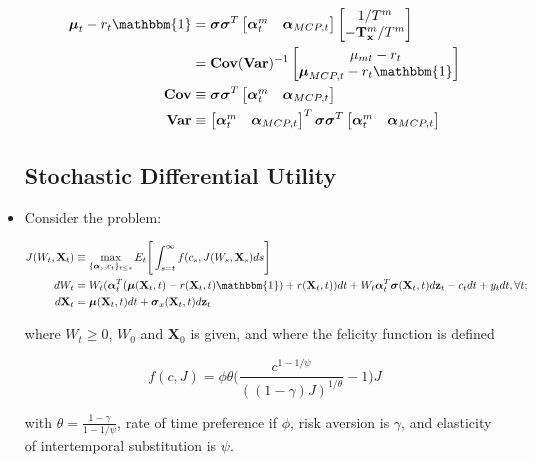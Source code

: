 \documentclass{article}
\newcommand{\xbf}{\mathbf{x}}
\newcommand{\Xbf}{\mathbf{X}}
\newcommand{\zbf}{\mathbf{z}}
\newcommand{\Tbf}{\mathbf{T}}
\newcommand{\mubf}{\boldsymbol{\mu}}
\newcommand{\alphabf}{\boldsymbol{\alpha}}
\newcommand{\sigmabf}{\boldsymbol{\sigma}}
\newcommand{\onebf}{\mathbbm{1}}
\newcommand{\Covbf}{\text{\textbf{Cov}}}
\newcommand{\Varbf}{\text{\textbf{Var}}}
\begin{document}
\begin{itemize}
\begin{align*}
\mubf_t - r_t \onebf 
&= \sigmabf \sigmabf^T \begin{bmatrix} \alphabf_t^m & \alphabf_{MCP, t} \end{bmatrix} \begin{bmatrix} 1/ T^m \\ -\Tbf_\xbf^m / T^m \end{bmatrix} \\
&= \Covbf(\Varbf)^{-1} \begin{bmatrix} \mu_{mt} - r_t \\ \mubf_{MCP, t} - r_t \onebf \end{bmatrix} \\
\Covbf &\equiv \sigmabf \sigmabf^T \begin{bmatrix} \alphabf_t^m & \alphabf_{MCP, t} \end{bmatrix} \\
\Varbf &\equiv \begin{bmatrix} \alphabf_t^m & \alphabf_{MCP, t} \end{bmatrix}^T \sigmabf \sigmabf^T \begin{bmatrix} \alphabf_t^m & \alphabf_{MCP, t} \end{bmatrix}
\end{align*}

\subsection*{Stochastic Differential Utility}

\item Consider the problem: 

\begin{align*}
J(W_t, \Xbf_t) &\equiv \max_{\{\alphabf_s, c_t\}_{t \le s}} E_t \Bigg[ \int_{s=t}^\infty f(c_s, J(W_s, \Xbf_s) ds\Bigg]\\
dW_t &= W_t (\alphabf_t^T (\mubf(\Xbf_t, t) - r(\Xbf_t, t)\onebf) + r(\Xbf_t, t))dt + W_t \alphabf_t^T \sigmabf(\Xbf_t, t) d\zbf_t - c_t dt + y_t dt, \forall t;\\
d\Xbf_t &= \mubf(\Xbf_t, t) dt + \sigmabf_x(\Xbf_t, t) d\zbf_t
\end{align*}

where $W_t \ge 0$, $W_0$ and $\Xbf_0$ is given, and where the felicity function is defined

$$
f(c, J) = \phi \theta \Bigg( \frac{c^{1-1/\psi}}{((1-\gamma)J)^{1/\theta}} - 1 \Bigg) J
$$

with $\theta = \frac{1 - \gamma}{1 - 1/\psi}$, rate of time preference if $\phi$, risk aversion is $\gamma$, and elasticity of intertemporal substitution is $\psi$.


\end{itemize}
\end{document}
